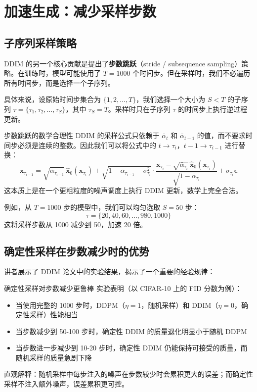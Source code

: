 \section{加速生成：减少采样步数}

\subsection{子序列采样策略}

DDIM 的另一个核心贡献是提出了\textbf{步数跳跃}（stride / subsequence sampling）策略。在训练时，模型可能使用了 $T=1000$ 个时间步。但在采样时，我们不必遍历所有时间步，而是选择一个子序列。

具体来说，设原始时间步集合为 $\{1, 2, \ldots, T\}$，我们选择一个大小为 $S < T$ 的子序列 $\tau = \{\tau_1, \tau_2, \ldots, \tau_S\}$，其中 $\tau_S = T$。采样时只在子序列 $\tau$ 的时间步上执行逆过程更新。

\begin{importantbox}{步数跳跃的数学合理性}
DDIM 的采样公式只依赖于 $\bar{\alpha}_t$ 和 $\bar{\alpha}_{t-1}$ 的值，而不要求时间步必须是连续的整数。因此我们可以将公式中的 $t \to \tau_i$，$t-1 \to \tau_{i-1}$ 进行替换：
$$
\mathbf{x}_{\tau_{i-1}} = \sqrt{\bar{\alpha}_{\tau_{i-1}}}\,\hat{\mathbf{x}}_0(\mathbf{x}_{\tau_i}) + \sqrt{1-\bar{\alpha}_{\tau_{i-1}}-\sigma_{\tau_i}^2}\cdot\frac{\mathbf{x}_{\tau_i} - \sqrt{\bar{\alpha}_{\tau_i}}\,\hat{\mathbf{x}}_0(\mathbf{x}_{\tau_i})}{\sqrt{1-\bar{\alpha}_{\tau_i}}} + \sigma_{\tau_i}\boldsymbol{\epsilon}
$$
这本质上是在一个更粗粒度的噪声调度上执行 DDIM 更新，数学上完全合法。
\end{importantbox}

例如，从 $T=1000$ 步的模型中，我们可以均匀选取 $S=50$ 步：
$$
\tau = \{20, 40, 60, \ldots, 980, 1000\}
$$
这将采样步数从 1000 减少到 50，加速 20 倍。

\subsection{确定性采样在步数减少时的优势}

讲者展示了 DDIM 论文中的实验结果，揭示了一个重要的经验规律：

\begin{importantbox}{确定性采样对步数减少更鲁棒}
实验表明（以 CIFAR-10 上的 FID 分数为例）：
\begin{itemize}
    \item 当使用完整的 1000 步时，DDPM（$\eta=1$，随机采样）和 DDIM（$\eta=0$，确定性采样）性能相当
    \item 当步数减少到 50-100 步时，确定性 DDIM 的质量退化明显小于随机 DDPM
    \item 当步数进一步减少到 10-20 步时，确定性 DDIM 仍能保持可接受的质量，而随机采样的质量急剧下降
\end{itemize}
直观解释：随机采样中每步注入的噪声在步数较少时会累积更大的误差；而确定性采样不注入额外噪声，误差累积更可控。
\end{importantbox}

